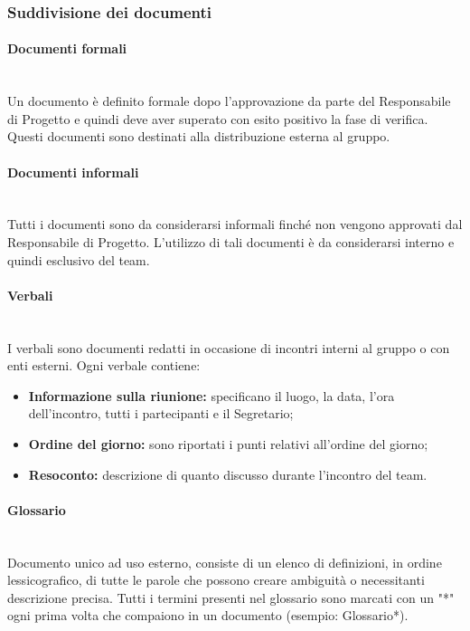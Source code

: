 \documentclass[11pt,a4paper]{article}
\begin{document}
	\subsubsection{Suddivisione dei documenti}
	\paragraph{Documenti formali}
	\noindent \\ Un documento è definito formale dopo l’approvazione da parte del Responsabile di Progetto e quindi deve aver superato con esito positivo la fase di verifica. Questi documenti sono destinati alla distribuzione esterna al gruppo.
	
	\paragraph{Documenti informali}
	\noindent \\ Tutti i documenti sono da considerarsi informali finché non vengono approvati dal Responsabile di Progetto. L’utilizzo di tali documenti è da considerarsi interno e quindi esclusivo del team.
	
	\paragraph{Verbali}
	\noindent \\ I verbali sono documenti redatti in occasione di incontri interni al gruppo o con enti esterni. Ogni verbale contiene:
	
	\begin{itemize}
	\item \textbf{Informazione sulla riunione:} specificano il luogo, la data, l'ora dell’incontro, tutti i partecipanti e il Segretario;
	\item \textbf{Ordine del giorno:} sono riportati i punti relativi all’ordine del giorno;
	\item \textbf{Resoconto:} descrizione di quanto discusso durante l'incontro del team.
	\end{itemize}
	
	\paragraph{Glossario}
\noindent \\ Documento unico ad uso esterno, consiste di un elenco di definizioni, in ordine lessicografico, di tutte le parole che possono creare ambiguità o necessitanti descrizione precisa. Tutti i termini presenti nel glossario sono marcati con un "*" ogni prima volta che compaiono in un documento (esempio: Glossario*).
\end{document}

